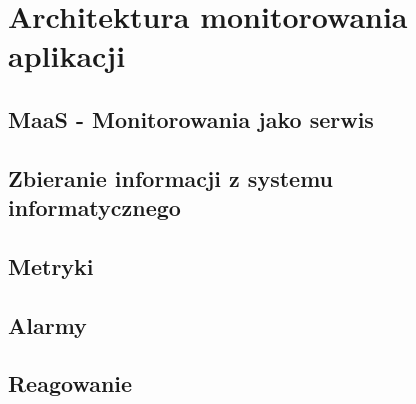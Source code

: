 \chapter{Architektura monitorowania aplikacji}
\label{chapter:monitoring_architecture}

\clearpage 
\section{\textbf{MaaS} - Monitorowania jako serwis}
\clearpage 
\section{Zbieranie informacji z systemu informatycznego}
\section{Metryki}
\section{Alarmy}
\section{Reagowanie}